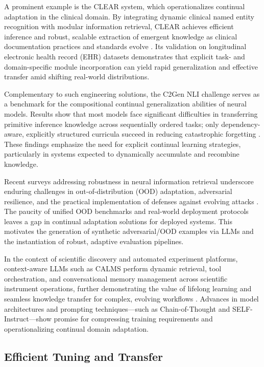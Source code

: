 \documentclass[sigconf]{acmart}
\begin{document}
A prominent example is the CLEAR system, which operationalizes continual adaptation in the clinical domain. By integrating dynamic clinical named entity recognition with modular information retrieval, CLEAR achieves efficient inference and robust, scalable extraction of emergent knowledge as clinical documentation practices and standards evolve \cite{ref7}. Its validation on longitudinal electronic health record (EHR) datasets demonstrates that explicit task- and domain-specific module incorporation can yield rapid generalization and effective transfer amid shifting real-world distributions.

Complementary to such engineering solutions, the C2Gen NLI challenge serves as a benchmark for the compositional continual generalization abilities of neural models. Results show that most models face significant difficulties in transferring primitive inference knowledge across sequentially ordered tasks; only dependency-aware, explicitly structured curricula succeed in reducing catastrophic forgetting \cite{ref46}. These findings emphasize the need for explicit continual learning strategies, particularly in systems expected to dynamically accumulate and recombine knowledge.

Recent surveys addressing robustness in neural information retrieval underscore enduring challenges in out-of-distribution (OOD) adaptation, adversarial resilience, and the practical implementation of defenses against evolving attacks \cite{ref54}. The paucity of unified OOD benchmarks and real-world deployment protocols leaves a gap in continual adaptation solutions for deployed systems. This motivates the generation of synthetic adversarial/OOD examples via LLMs and the instantiation of robust, adaptive evaluation pipelines.

In the context of scientific discovery and automated experiment platforms, context-aware LLMs such as CALMS perform dynamic retrieval, tool orchestration, and conversational memory management across scientific instrument operations, further demonstrating the value of lifelong learning and seamless knowledge transfer for complex, evolving workflows \cite{ref61}. Advances in model architectures and prompting techniques—such as Chain-of-Thought and SELF-Instruct—show promise for compressing training requirements and operationalizing continual domain adaptation.

\subsection{Efficient Tuning and Transfer}
\end{document}
